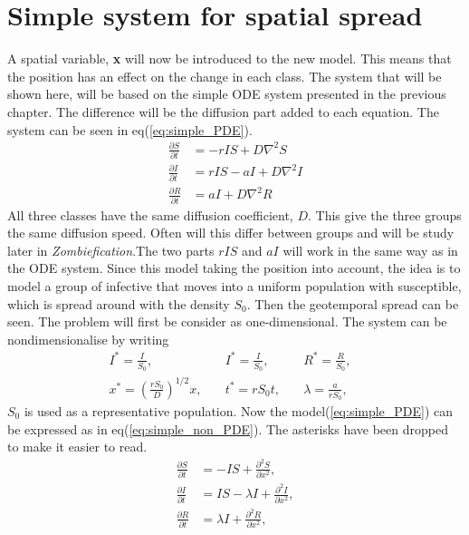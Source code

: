 \documentclass[%
twoside,                 %
final,                   %
10pt]{article}
\begin{document}
\section{Simple system for spatial spread}
A spatial variable, \textbf{x} will now be introduced to the new model. This means that the position has an effect on the change in each class. The system that will be shown here, will be based on the simple ODE system presented in the previous chapter. The difference will be the diffusion part added to each equation. The system can be seen in eq(\ref{eq:simple_PDE}). 
\begin{equation} \label{eq:simple_PDE}
	\begin{aligned}
	\frac{\partial S}{\partial t} &= -rIS + D\nabla ^2 S\\
	\frac{\partial I}{\partial t} &= rIS- aI + D\nabla ^2 I\\
	\frac{\partial R}{\partial t} &= aI + D\nabla ^2 R
	\end{aligned}
\end{equation}
All three classes have the same diffusion coefficient, $D$. This give the three groups the same diffusion speed. Often will this differ between groups and will be study later in \emph{Zombiefication}.The two parts $rIS$ and $aI$ will work in the same way as in the ODE system. Since this model taking the position into account, the idea is to model a group of infective that moves into a uniform population with susceptible, which is spread around with the density $S_0$. Then the geotemporal spread can be seen. The problem will first be consider as one-dimensional. The system can be nondimensionalise by writing 
\begin{equation} \label{eq:constants_nondimensional}
	\begin{aligned}
	I^* =\frac{I}{S_0},&\quad I^* = \frac{I}{S_0},&\quad R^*= \frac{R}{S_0},&\\
	x^* =\left(\frac{rS_0}{D}\right)^{1/2}x,&\quad t^*=rS_0t,&\quad \lambda =\frac{a}{rS_0},&
	\end{aligned}
\end{equation}
$S_0$ is used as a representative population. Now the model(\ref{eq:simple_PDE}) can be expressed as in eq(\ref{eq:simple_non_PDE}). The asterisks have been dropped to make it easier to read.
\begin{equation} \label{eq:simple_non_PDE}
	\begin{aligned}
	\frac{\partial S}{\partial t} &= -IS + \frac{\partial^2 S}{\partial x^2},\\
	\frac{\partial I}{\partial t} &= IS- \lambda I + \frac{\partial^2 I}{\partial x^2},\\
	\frac{\partial R}{\partial t} &= \lambda I + \frac{\partial^2 R}{\partial x^2},
	\end{aligned}
\end{equation}
\end{document}
